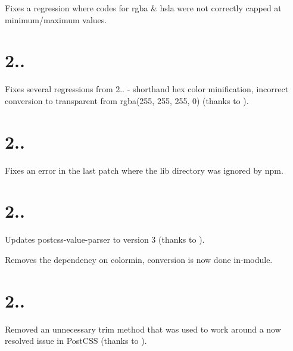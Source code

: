 \begin{DoxyItemize}
\item Fixes a regression where codes for {\ttfamily rgba} \& {\ttfamily hsla} were not correctly capped at minimum/maximum values.
\end{DoxyItemize}

\section*{2..}


\begin{DoxyItemize}
\item Fixes several regressions from 2.. -\/ shorthand hex color minification, incorrect conversion to {\ttfamily transparent} from {\ttfamily rgba(255, 255, 255, 0)} (thanks to ).
\end{DoxyItemize}

\section*{2..}


\begin{DoxyItemize}
\item Fixes an error in the last patch where the {\ttfamily lib} directory was ignored by npm.
\end{DoxyItemize}

\section*{2..}


\begin{DoxyItemize}
\item Updates postcss-\/value-\/parser to version 3 (thanks to ).
\item Removes the dependency on colormin, conversion is now done in-\/module.
\end{DoxyItemize}

\section*{2..}


\begin{DoxyItemize}
\item Removed an unnecessary {\ttfamily trim} method that was used to work around a now resolved issue in Post\+C\+SS (thanks to ).
\end{DoxyItemize}

